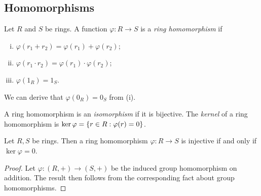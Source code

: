 \subsection{Homomorphisms}
\begin{definition}
	Let \( R \) and \( S \) be rings.
	A function \( \varphi \colon R \to S \) is a \textit{ring homomorphism} if
	\begin{enumerate}[(i)]
		\item \( \varphi(r_1 + r_2) = \varphi(r_1) + \varphi(r_2) \);
		\item \( \varphi(r_1 \cdot r_2) = \varphi(r_1) \cdot \varphi(r_2) \);
		\item \( \varphi(1_R) = 1_S \).
	\end{enumerate}
	We can derive that \( \varphi(0_R) = 0_S \) from (i).

	A ring homomorphism is an \textit{isomorphism} if it is bijective.
	The \textit{kernel} of a ring homomorphism is \( \ker \varphi = \qty{r \in R : \varphi(r) = 0} \).
\end{definition}
\begin{lemma}
	Let \( R, S \) be rings.
	Then a ring homomorphism \( \varphi \colon R \to S \) is injective if and only if \( \ker \varphi = \qty{0} \).
\end{lemma}
\begin{proof}
	Let \( \varphi \colon (R, +) \to (S, +) \) be the induced group homomorphism on addition.
	The result then follows from the corresponding fact about group homomorphisms.
\end{proof}

